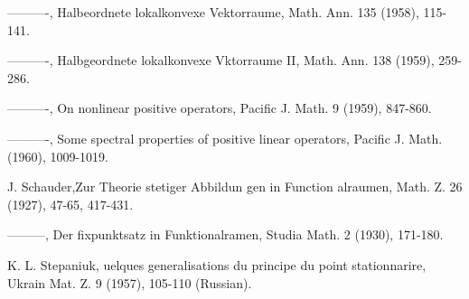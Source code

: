 \begin{thebibliography}{99}
 {----------}, Halbeordnete lokalkonvexe Vektorraume,
  Math. Ann. 135 (1958), 115-141. 

 {----------}, Halbgeordnete lokalkonvexe Vktorraume
  II, Math. Ann. 138 (1959), 259-286. 

 {----------}, On nonlinear positive operators, Pacific
  J. Math. 9 (1959), 847-860. 

 {----------}, Some spectral properties of positive
  linear operators, Pacific J. Math. (1960), 1009-1019. 

 {J. Schauder},\pageoriginale Zur Theorie stetiger
  Abbildun gen in  Function alraumen, Math. Z. 26 (1927), 47-65,
  417-431.  

 {---------}, Der fixpunktsatz in Funktionalramen, Studia
  Math. 2 (1930), 171-180. 

 {K. L. Stepaniuk}, uelques generalisations du principe
  du point stationnarire, Ukrain Mat. Z. 9 (1957), 105-110 (Russian). 
\end{thebibliography}

